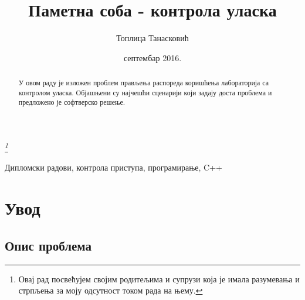 \documentclass[a4paper, 12pt, diplomski]{etfcyr}
\title{Паметна соба - контрола уласка}
\author{Топлица Танасковић}
\date{септембар 2016.}
\begin{document}
	\sloppy
	\maketitle

	\thispagestyle{empty}
	\vspace*{\fill}
	\begin{center}
			\textit{\thanks{Овај рад посвећујем својим родитељима и супрузи која је имала разумевања и стрпљења за моју одсутност током рада на њему.}}
	\end{center}
	\vspace*{\fill}

	\begin{abstract}
		\begin{justify}
			У овом раду је изложен проблем прављења распореда коришћења лабораторија са контролом уласка. Објашњени су најчешћи сценарији који задају доста проблема и предложено је софтверско решење.
		\end{justify}
	\end{abstract}

	\begin{keywords}
		Дипломски радови, контрола приступа, програмирање, C++
	\end{keywords}
	\tableofcontents
	\listoffigures
	\listoftables
	\lstlistoflistings

	\chapter{Увод}

		\section{Опис проблема}
\end{document}

